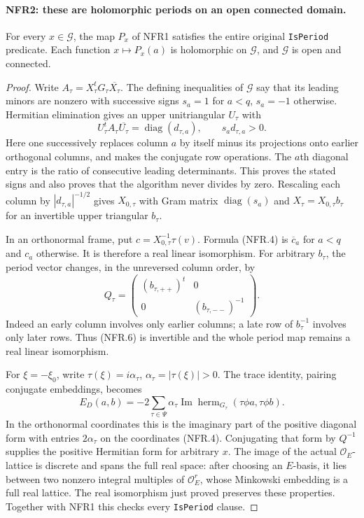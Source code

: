 \documentclass[11pt,a4paper]{article}
\numberwithin{equation}{section}
\theoremstyle{remark}\newtheorem{remark}[theorem]{Remark}
\begin{document}
\paragraph{NFR2: these are holomorphic periods on an open connected domain.}
\label{claim:NFR2}
For every $x\in\mathcal G$, the map $P_x$ of NFR1 satisfies the
entire original \texttt{Is\allowbreak Period} predicate.  Each function
$x\mapsto P_x(a)$ is holomorphic on $\mathcal G$, and
$\mathcal G$ is open and connected.

\begin{proof}
Write $A_\tau=X_\tau^tG_\tau\overline{X_\tau}$.
The defining inequalities of $\mathcal G$ say that its leading
minors are nonzero with successive signs
$s_a=1$ for $a<q$, $s_a=-1$ otherwise.
Hermitian elimination gives an upper unitriangular $U_\tau$ with
\[
 U_\tau^tA_\tau\overline{U_\tau}
       =\operatorname{diag}(d_{\tau,a}),\qquad s_a d_{\tau,a}>0.
 \tag{NFR.5}
\]
Here one successively replaces column $a$ by itself minus its
projections onto earlier orthogonal columns, and makes the
conjugate row operations.  The $a$th diagonal entry is the ratio
of consecutive leading determinants.  This proves the stated signs
and also proves that the algorithm never divides by zero.
Rescaling each column by $|d_{\tau,a}|^{-1/2}$ gives $X_{0,\tau}$
with Gram matrix $\operatorname{diag}(s_a)$ and
$X_\tau=X_{0,\tau}b_\tau$ for an invertible upper triangular $b_\tau$.

In an orthonormal frame, put $c=X_{0,\tau}^{-1}\tau(v)$.
Formula (NFR.4) is $\overline c_a$ for $a<q$ and $c_a$ otherwise.
It is therefore a real linear isomorphism.  For arbitrary $b_\tau$,
the period vector changes, in the unreversed column order, by
\[
 Q_\tau=
 \begin{pmatrix} (b_{\tau,++})^t&0\\0&(b_{\tau,--})^{-1}\end{pmatrix}.
 \tag{NFR.6}
\]
Indeed an early column involves only earlier columns; a late row
of $b_\tau^{-1}$ involves only later rows.  Thus (NFR.6) is
invertible and the whole period map remains a real linear isomorphism.

For $\xi=-\xi_0$, write $\tau(\xi)=i\alpha_\tau$,
$\alpha_\tau=|\tau(\xi)|>0$.
The trace identity, pairing conjugate embeddings, becomes
\[
 E_D(a,b)=-2\sum_{\tau\in\Psi}\alpha_\tau
          \operatorname{Im}\operatorname{herm}_{G_\tau}
                         (\tau\phi a,\tau\phi b).
 \tag{NFR.7}
\]
In the orthonormal coordinates this is the imaginary part of the
positive diagonal form with entries $2\alpha_\tau$ on the
coordinates (NFR.4).  Conjugating that form by $Q^{-1}$ supplies
the positive Hermitian form for arbitrary $x$.
The image of the actual $\mathcal O_E$-lattice is discrete and
spans the full real space: after choosing an $E$-basis, it lies
between two nonzero integral multiples of $\mathcal O_E^r$,
whose Minkowski embedding is a full real lattice.  The real
isomorphism just proved preserves these properties.
Together with NFR1 this checks every \texttt{Is\allowbreak Period} clause.


\end{proof}
\end{document}
